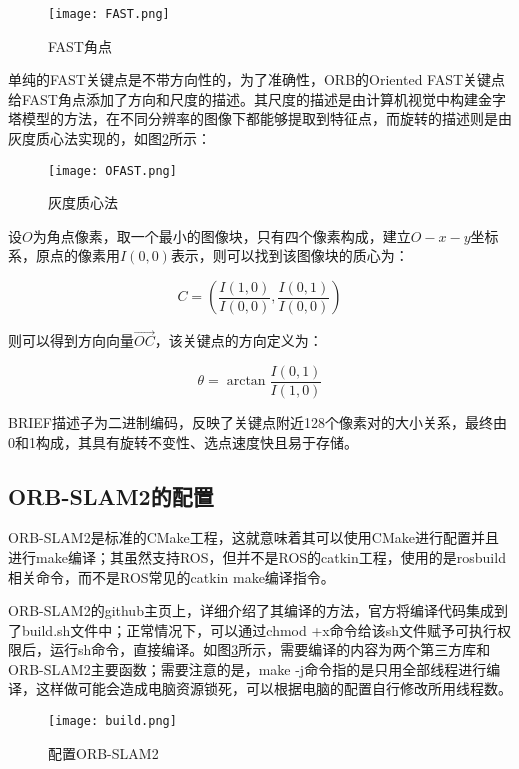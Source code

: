 \begin{figure}[!ht]
	\centering
	\texttt{[image: FAST.png]}
	\caption{FAST角点} 
	\label{fig7}
\end{figure}

单纯的FAST关键点是不带方向性的，为了准确性，ORB的Oriented FAST关键点给FAST角点添加了方向和尺度的描述。其尺度的描述是由计算机视觉中构建金字塔模型的方法，在不同分辨率的图像下都能够提取到特征点，而旋转的描述则是由灰度质心法实现的，如图\ref{fig8}所示：

\begin{figure}[!ht]
	\centering
	\texttt{[image: OFAST.png]}
	\caption{灰度质心法}
	\label{fig8}
\end{figure}

设$O$为角点像素，取一个最小的图像块，只有四个像素构成，建立$O-x-y$坐标系，原点的像素用$I(0,0)$表示，则可以找到该图像块的质心为：

\begin{equation}
C=(\frac{I(1,0)}{I(0,0)}, \frac{I(0,1)}{I(0,0)})
\end{equation}

则可以得到方向向量$\vec{OC}$，该关键点的方向定义为：

\begin{equation}
\theta = \arctan{\frac{I(0,1)}{I(1,0)}}
\end{equation}


BRIEF描述子为二进制编码，反映了关键点附近128个像素对的大小关系，最终由0和1构成，其具有旋转不变性、选点速度快且易于存储。


\subsection{ORB-SLAM2的配置}
ORB-SLAM2是标准的CMake工程，这就意味着其可以使用CMake进行配置并且进行make编译；其虽然支持ROS，但并不是ROS的catkin工程，使用的是rosbuild相关命令，而不是ROS常见的catkin make编译指令。

ORB-SLAM2的github主页上，详细介绍了其编译的方法，官方将编译代码集成到了build.sh文件中；正常情况下，可以通过chmod +x命令给该sh文件赋予可执行权限后，运行sh命令，直接编译。如图\ref{fig10}所示，需要编译的内容为两个第三方库和ORB-SLAM2主要函数；需要注意的是，make -j命令指的是只用全部线程进行编译，这样做可能会造成电脑资源锁死，可以根据电脑的配置自行修改所用线程数。

\begin{figure}[!ht]
	\centering
	\texttt{[image: build.png]}
	\caption{配置ORB-SLAM2}
	\label{fig10}
\end{figure}

